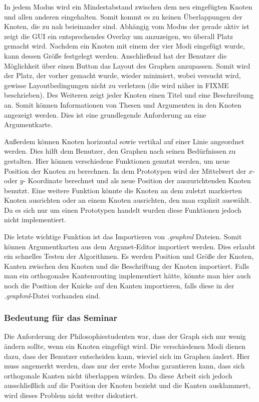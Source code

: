 In jedem Modus wird ein Mindestabstand zwischen dem neu eingefügten Knoten und allen
anderen eingehalten. Somit kommt es zu keinen Überlappungen der Knoten, die zu nah
beieinander sind. Abhängig vom Modus der gerade aktiv ist zeigt die GUI ein entsprechendes
Overlay um anzuzeigen, wo überall Platz gemacht wird. Nachdem ein Knoten mit einem der
vier Modi eingefügt wurde, kann dessen Größe festgelegt werden. Anschließend hat der
Benutzer die Möglichkeit über einen Button das Layout des Graphen anzupassen. Somit wird
der Platz, der vorher gemacht wurde, wieder minimiert, wobei versucht wird, gewisse
Layoutbedingungen nicht zu verletzen (die wird näher in FIXME beschrieben).
Des Weiteren zeigt jeder Knoten einen Titel und eine Beschreibung an. Somit können
Informationen von Thesen und Argumenten in den Knoten angezeigt werden. Dies ist eine
grundlegende Anforderung an eine Argumentkarte.

Außerdem können Knoten horizontal sowie vertikal auf einer Linie angeordnet werden. Dies
hilft dem Benutzer, den Graphen nach seinen Bedürfnissen zu gestalten. Hier können
verschiedene Funktionen genutzt werden, um neue Position der Knoten zu berechnen. In
dem Prototypen wird der Mittelwert der $x$- oder $y$- Koordinate berechnet und als neue Position
der auszurichtenden Knoten benutzt. Eine weitere Funktion könnte die Knoten an dem zuletzt
markierten Knoten ausrichten oder an einem Knoten ausrichten, den man explizit auswählt.
Da es sich nur um einen Prototypen handelt wurden diese Funktionen jedoch nicht
implementiert.

Die letzte wichtige Funktion ist das Importieren von \textit{.graphml} Dateien. Somit können
Argumentkarten aus dem Argunet-Editor importiert werden. Dies erlaubt ein schnelles Testen
der Algorithmen. Es werden Position und Größe der Knoten, Kanten zwischen den Knoten
und die Beschriftung der Knoten importiert. Falls man ein orthogonales Kantenrouting
implementiert hätte, könnte man hier auch noch die Position der Knicke auf den Kanten
importieren, falls diese in der \textit{.graphml}-Datei vorhanden sind.

\subsubsection{Bedeutung für das Seminar}

Die Anforderung der Philosophiestudenten war, dass der Graph sich nur wenig ändern sollte,
wenn ein Knoten eingefügt wird. Die verschiedenen Modi dienen dazu, dass der Benutzer
entscheiden kann, wieviel sich im Graphen ändert. Hier muss angemerkt werden, dass nur
der erste Modus garantieren kann, dass sich orthogonale Kanten nicht überlappen würden.
Da diese Arbeit sich jedoch ausschließlich auf die Position der Knoten bezieht und die Kanten
ausklammert, wird dieses Problem nicht weiter diskutiert.

